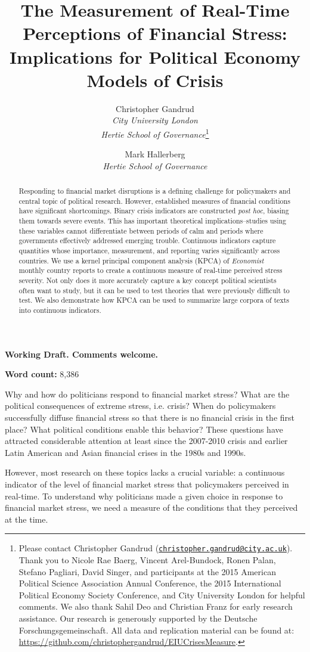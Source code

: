 \documentclass[]{article}
\title{The Measurement of Real-Time Perceptions of Financial Stress: Implications for Political Economy Models of Crisis}
\author{Christopher Gandrud \\ \emph{City University London} \\ \emph{Hertie School of Governance}\footnote{Please contact Christopher Gandrud
(\href{mailto:christopher.gandrud@city.ac.uk}{\nolinkurl{christopher.gandrud@city.ac.uk}}).
Thank you to Nicole Rae Baerg, Vincent Arel-Bundock, Ronen Palan, Stefano Pagliari, David Singer, and participants at the 2015 American Political Science Association Annual Conference, the 2015 International Political Economy Society Conference, and City University London for helpful comments. We also thank Sahil Deo and Christian Franz for early research assistance. Our research is generously supported by the Deutsche Forschungsgemeinschaft. All data and replication material can be found at:
\url{https://github.com/christophergandrud/EIUCrisesMeasure}.}
\and
Mark Hallerberg \\ \emph{Hertie School of Governance}}
\begin{document}
\maketitle

\begin{center}
    \textbf{Working Draft. Comments welcome.}
\end{center}


\begin{abstract}

Responding to financial market disruptions is a defining challenge for policymakers and central topic of political research. However, established measures of financial conditions have significant shortcomings. Binary crisis indicators \cite[e.g.][]{laeven2013} are constructed \emph{post hoc}, biasing them towards severe events. This has important theoretical implications--studies using these variables cannot differentiate between periods of calm and periods where governments effectively addressed emerging trouble. Continuous indicators capture quantities whose importance, measurement, and reporting varies significantly across countries. We use a kernel principal component analysis (KPCA) of \emph{Economist} monthly country reports to create a continuous measure of real-time perceived stress severity. Not only does it more accurately capture a key concept political scientists often want to study, but it can be used to test theories that were previously difficult to test. We also demonstrate how KPCA can be used to summarize large corpora of texts into continuous indicators.

\end{abstract}


\textbf{Word count:} 8,386

\clearpage

Why and how do politicians respond to financial market stress? What are the political consequences of extreme stress, i.e. crisis? When do policymakers successfully diffuse financial stress so that there is no financial crisis in the first place? What political conditions enable this behavior? These questions have attracted considerable attention at least since the 2007-2010 crisis and earlier Latin American and Asian financial crises in the 1980s and 1990s.

However, most research on these topics lacks a crucial variable: a continuous indicator of the level of financial market stress that policymakers perceived in real-time. To understand why politicians made a given choice in response to financial market stress, we need a measure of the conditions that they perceived at the time.
\end{document}
